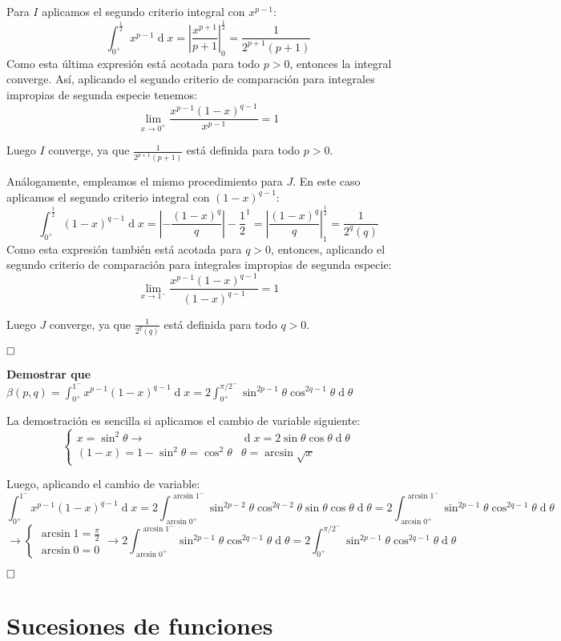 \documentclass[a4paper]{article}
\renewcommand{\d}[1]{\ensuremath{\operatorname{d}\!{#1}}}
\newcommand{\qed}{\begin{flushright}
		{$\newline\square$}
	\end{flushright}}
\begin{document}
Para $I$ aplicamos el segundo criterio integral con $x^{p-1}$:
$$\int_{0^+}^{\frac{1}{2}} x^{p-1} \d x = \left|\frac{x^{p+1}}{p+1}\right|^\frac{1}{2}_0 = \frac{1}{2^{p+1}(p+1)}$$
Como esta última expresión está acotada para todo $p> 0$, entonces la integral converge. Así, aplicando el segundo criterio de comparación para integrales impropias de segunda especie tenemos:
$$\lim_{x\rightarrow 0^+} \frac{x^{p-1}(1-x)^{q-1}}{x^{p-1}} = 1$$

Luego $I$ converge, ya que $\frac{1}{2^{p+1}(p+1)}$ está definida para todo $p>0$.

Análogamente, empleamos el mismo procedimiento para $J$. 
En este caso aplicamos el segundo criterio integral con $(1-x)^{q-1}$:
$$\int_{0^+}^{\frac{1}{2}} (1-x)^{q-1} \d x = \left|-\frac{(1-x)^{q}}{q}\right|-\frac{1}{2}^1 = \left|\frac{(1-x)^{q}}{q}\right|^\frac{1}{2}_1 = \frac{1}{2^{q}(q)}$$
Como esta expresión también está acotada para $q>0$, entonces, aplicando el segundo criterio de comparación para integrales impropias de segunda especie:
$$\lim_{x\rightarrow 1^-} \frac{x^{p-1}(1-x)^{q-1}}{(1-x)^{q-1}} = 1$$

Luego $J$ converge, ya que $\frac{1}{2^{q}(q)}$ está definida para todo $q>0$.\qed

\textbf{Demostrar que $\beta(p,q) = \int_{0^+}^{1^-} x^{p-1}(1-x)^{q-1} \d x  = 2\int_{0^+}^{\pi/2^-} \sin^{2p-1} \theta \cos^{2q-1} \theta \d \theta$}

La demostración es sencilla si aplicamos el cambio de variable siguiente:
$$\begin{cases}
x = \sin^2 \theta \rightarrow & \d x = 2\sin\theta\cos\theta \d \theta\\
(1-x) = 1- \sin^2\theta = \cos^2\theta & \theta = \arcsin\sqrt x
\end{cases}$$

Luego, aplicando el cambio de variable:
$$\int_{0^+}^{1^-} x^{p-1}(1-x)^{q-1} \d x = 2\int_{\arcsin{0^+}}^{\arcsin{1^-}} \sin^{2p-2} \theta \cos^{2q-2}\theta \sin\theta\cos\theta \d \theta = 2\int_{\arcsin{0^+}}^{\arcsin{1^-}} \sin^{2p-1} \theta \cos^{2q-1}\theta \d \theta
$$
$$\rightarrow \begin{cases}
\arcsin1 = \frac{\pi}{2}\\\arcsin0 = 0
\end{cases}\rightarrow 2\int_{\arcsin{0^+}}^{\arcsin{1^-}} \sin^{2p-1} \theta \cos^{2q-1}\theta \d \theta = 2\int_{0^+}^{\pi/2^-} \sin^{2p-1} \theta \cos^{2q-1} \theta \d \theta$$\qed

\section{Sucesiones de funciones}
\end{document}
